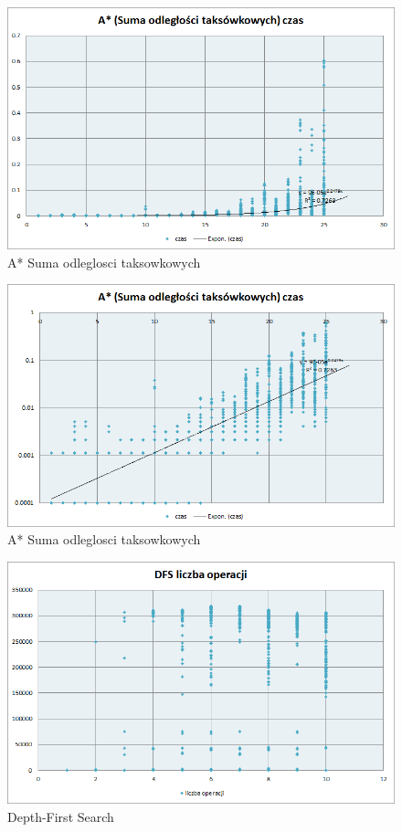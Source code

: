 \documentclass{classrep}
\begin{document}
\begin{figure}[ht]
\centering
			\includegraphics[scale=0.65]{pictures/A3_czas_exp.png}
	\caption{A* Suma odleglosci taksowkowych}
	\label{fig:A* Suma odleglosci taksowkowych}
\end{figure}

\begin{figure}[ht]
\centering
			\includegraphics[scale=0.65]{pictures/A3_czas_log.png}
	\caption{A* Suma odleglosci taksowkowych}
	\label{fig:A* Suma odleglosci taksowkowych}
\end{figure}

\clearpage

\begin{figure}[ht]
\centering
			\includegraphics[scale=0.65]{pictures/DFS_operacje_exp.png}
	\caption{Depth-First Search}
	\label{fig:Depth-First Search}
\end{figure}
\end{document}
